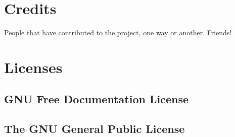 \chapter{Credits}
People that have contributed to the project, one way or another. Friends!
%
\begin{multicols}{2}
\noindent\caps{\small{}}
\end{multicols}

\chapter{Licenses}

\section{GNU Free Documentation License}

\newpage
\section{The GNU General Public License}

